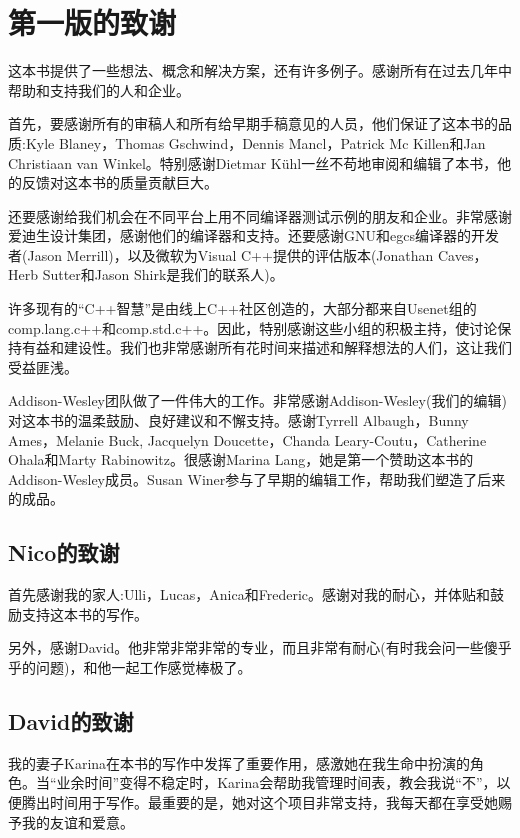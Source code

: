 \chapter{第一版的致谢}

这本书提供了一些想法、概念和解决方案，还有许多例子。感谢所有在过去几年中帮助和支持我们的人和企业。

首先，要感谢所有的审稿人和所有给早期手稿意见的人员，他们保证了这本书的品质:Kyle Blaney，Thomas Gschwind，Dennis Mancl，Patrick Mc Killen和Jan Christiaan van Winkel。特别感谢Dietmar K{\"u}hl一丝不苟地审阅和编辑了本书，他的反馈对这本书的质量贡献巨大。

还要感谢给我们机会在不同平台上用不同编译器测试示例的朋友和企业。非常感谢爱迪生设计集团，感谢他们的编译器和支持。还要感谢GNU和egcs编译器的开发者(Jason Merrill)，以及微软为Visual C++提供的评估版本(Jonathan Caves，Herb Sutter和Jason Shirk是我们的联系人)。

许多现有的“C++智慧”是由线上C++社区创造的，大部分都来自Usenet组的comp.lang.c++和comp.std.c++。因此，特别感谢这些小组的积极主持，使讨论保持有益和建设性。我们也非常感谢所有花时间来描述和解释想法的人们，这让我们受益匪浅。

Addison-Wesley团队做了一件伟大的工作。非常感谢Addison-Wesley(我们的编辑)对这本书的温柔鼓励、良好建议和不懈支持。感谢Tyrrell Albaugh，Bunny Ames，Melanie Buck, Jacquelyn Doucette，Chanda Leary-Coutu，Catherine Ohala和Marty Rabinowitz。很感谢Marina Lang，她是第一个赞助这本书的Addison-Wesley成员。Susan Winer参与了早期的编辑工作，帮助我们塑造了后来的成品。

\section{Nico的致谢}

首先感谢我的家人:Ulli，Lucas，Anica和Frederic。感谢对我的耐心，并体贴和鼓励支持这本书的写作。

另外，感谢David。他非常非常非常的专业，而且非常有耐心(有时我会问一些傻乎乎的问题)，和他一起工作感觉棒极了。

\section{David的致谢}

我的妻子Karina在本书的写作中发挥了重要作用，感激她在我生命中扮演的角色。当“业余时间”变得不稳定时，Karina会帮助我管理时间表，教会我说“不”，以便腾出时间用于写作。最重要的是，她对这个项目非常支持，我每天都在享受她赐予我的友谊和爱意。

